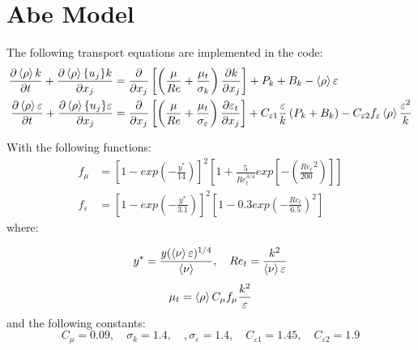 
\section{Abe Model}
The following transport equations are implemented in the code:
\begin{equation} \label{eq:ktDeng}
\begin{split}
\frac{\partial \left<{\rho}\right> k}{\partial { t}} + \frac{\partial \left<{\rho}\right> \{{u_j}\} k}{\partial {x_j}} &= \frac{\partial}{\partial x_j}\left[\left(\frac{\mu}{Re} + \frac{\mu_t}{\sigma_k}\right)\frac{\partial k}{\partial {x_j}}\right] + P_{k} + B_k- \left<{\rho}\right>\varepsilon \\
\frac{\partial  \left<{\rho}\right> \varepsilon}{\partial {t}} + \frac{\partial  \left<{\rho}\right> \{{u_j}\} \varepsilon}{\partial { x_j}} &= \frac{\partial}{\partial x_j}\left[ \left(\frac{\mu}{Re} + \frac{\mu_t}{\sigma_{\varepsilon}}\right)\frac{\partial  \varepsilon_t}{\partial {x_j}}\right] + C_{\varepsilon1}\frac{\varepsilon}{k}\left(P_k+B_k\right)  -C_{\varepsilon2} f_{\varepsilon}\left<{\rho}\right>\frac{\varepsilon^2}{k}   
\end{split}
\end{equation}

With the following functions:
\begin{equation}
\begin{split}
    f_\mu  &=\left[1-exp\left(-\frac{y^*}{14}\right)\right]^2\left[1+\frac{5}{Re_t^{3/4}}exp\left[-\left(\frac{Re_t}{200}^2\right)\right]\right] \\
	f_\varepsilon &= \left[1-exp\left(-\frac{y^*}{3.1}\right)\right]^2\left[1-0.3exp\left(-\frac{Re_t}{6.5}\right)^2\right] 
\end{split}
\end{equation}
 where:

 \begin{equation}
y^* = \frac{y(\left<{\nu}\right>\varepsilon)^{1/4}}{\left<{\nu}\right>}, \quad Re_t = \frac{k^2}{\left<{\nu}\right> \varepsilon}
 \end{equation}
\begin{equation}
\mu_t = \left<{\rho}\right> C_\mu f_\mu \frac{k^2}{\varepsilon}
\end{equation}
and the following constants:
\begin{equation}
C_\mu = 0.09, \quad \sigma_k = 1.4, \quad, \sigma_\varepsilon = 1.4, \quad C_{\varepsilon1} = 1.45, \quad C_{\varepsilon2}=1.9
\end{equation}

